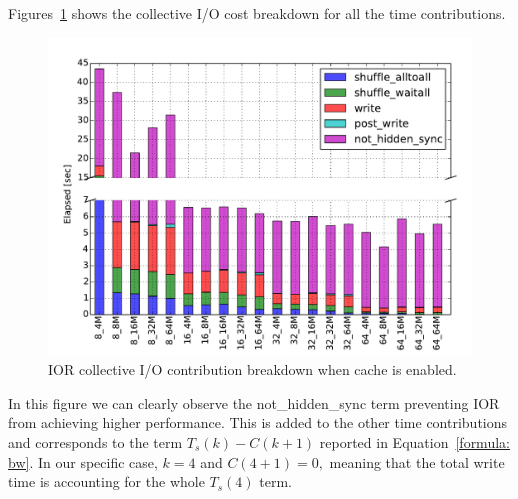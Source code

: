 Figures~\ref{figure: ior-elaps-enable} shows the collective I/O cost breakdown for all the time contributions. 
\begin{figure}[htb]
  \centering
  \includegraphics[width=0.95\columnwidth]{figures/ior_32GB_30sec_enable}
  \caption{IOR collective I/O contribution breakdown when cache is enabled.}
  \label{figure: ior-elaps-enable}
\end{figure}
In this figure we can clearly observe the not\_hidden\_sync term preventing IOR from achieving higher performance. This is added to the other time contributions and corresponds to the term $T_s(k)-C(k+1)$ reported in Equation~\ref{formula: bw}. In our specific case, $k = 4$ and $C(4+1) = 0,$ meaning that the total write time is accounting for the whole $T_s(4)$ term.

